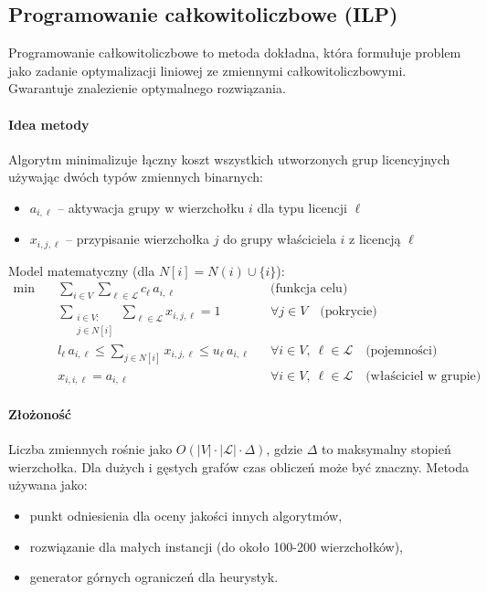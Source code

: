 \subsection{Programowanie całkowitoliczbowe (ILP)}\label{subsec:ilp}

Programowanie całkowitoliczbowe to metoda dokładna, która formułuje problem jako zadanie optymalizacji liniowej ze zmiennymi całkowitoliczbowymi. Gwarantuje znalezienie optymalnego rozwiązania.

\paragraph{Idea metody}
Algorytm minimalizuje łączny koszt wszystkich utworzonych grup licencyjnych używając dwóch typów zmiennych binarnych:
\begin{itemize}
  \item $a_{i,\ell}$ -- aktywacja grupy w wierzchołku $i$ dla typu licencji $\ell$
  \item $x_{i,j,\ell}$ -- przypisanie wierzchołka $j$ do grupy właściciela $i$ z licencją $\ell$
\end{itemize}

Model matematyczny (dla $N[i] = N(i) \cup \{i\}$):
\begin{align}
\min\quad & \sum_{i\in V}\sum_{\ell\in\mathcal{L}} c_\ell\, a_{i,\ell} && \text{(funkcja celu)}\\[4pt]
& \sum_{\substack{i\in V:\\ j\in N[i]}}\sum_{\ell\in\mathcal{L}} x_{i,j,\ell} = 1 && \forall j\in V \quad \text{(pokrycie)} \\[2pt]
& l_\ell\, a_{i,\ell} \le \sum_{j\in N[i]} x_{i,j,\ell} \le u_\ell\, a_{i,\ell} && \forall i\in V,\ \ell\in\mathcal{L} \quad \text{(pojemności)} \\[2pt]
& x_{i,i,\ell} = a_{i,\ell} && \forall i\in V,\ \ell\in\mathcal{L} \quad \text{(właściciel w grupie)}
\end{align}

\paragraph{Złożoność}
Liczba zmiennych rośnie jako $O(|V| \cdot |\mathcal{L}| \cdot \Delta)$, gdzie $\Delta$ to maksymalny stopień wierzchołka. Dla dużych i gęstych grafów czas obliczeń może być znaczny. Metoda używana jako:
\begin{itemize}
  \item punkt odniesienia dla oceny jakości innych algorytmów,
  \item rozwiązanie dla małych instancji (do około 100-200 wierzchołków),
  \item generator górnych ograniczeń dla heurystyk.
\end{itemize}


